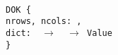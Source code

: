 \begin{myquote}\small{\texttt{\\
\Bsig DOK \{\\
\TA nrows, ncols: \Bint,\\
\TA dict: \Bint~$\rightarrow$~\Bint~$\rightarrow$~Value\\
\}
}}
\end{myquote}